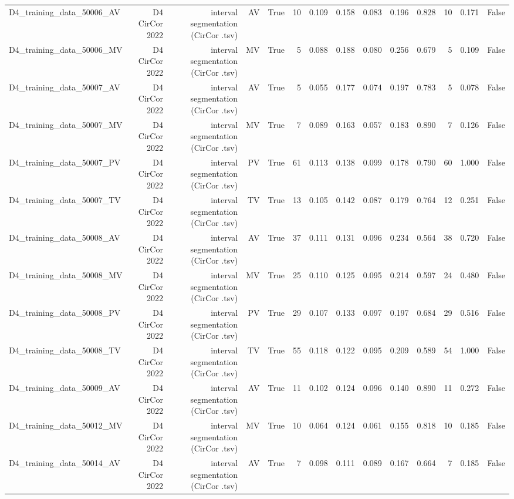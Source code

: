 \begin{table}[htbp]
\begin{tabular}{lrrrrrrrrrrrrr}
    D4\_training\_data\_50006\_AV & D4 CirCor 2022 & interval segmentation (CirCor .tsv) & AV & True & 10 & 0.109 & 0.158 & 0.083 & 0.196 & 0.828 & 10 & 0.171 & False \\
    D4\_training\_data\_50006\_MV & D4 CirCor 2022 & interval segmentation (CirCor .tsv) & MV & True & 5 & 0.088 & 0.188 & 0.080 & 0.256 & 0.679 & 5 & 0.109 & False \\
    D4\_training\_data\_50007\_AV & D4 CirCor 2022 & interval segmentation (CirCor .tsv) & AV & True & 5 & 0.055 & 0.177 & 0.074 & 0.197 & 0.783 & 5 & 0.078 & False \\
    D4\_training\_data\_50007\_MV & D4 CirCor 2022 & interval segmentation (CirCor .tsv) & MV & True & 7 & 0.089 & 0.163 & 0.057 & 0.183 & 0.890 & 7 & 0.126 & False \\
    D4\_training\_data\_50007\_PV & D4 CirCor 2022 & interval segmentation (CirCor .tsv) & PV & True & 61 & 0.113 & 0.138 & 0.099 & 0.178 & 0.790 & 60 & 1.000 & False \\
    D4\_training\_data\_50007\_TV & D4 CirCor 2022 & interval segmentation (CirCor .tsv) & TV & True & 13 & 0.105 & 0.142 & 0.087 & 0.179 & 0.764 & 12 & 0.251 & False \\
    D4\_training\_data\_50008\_AV & D4 CirCor 2022 & interval segmentation (CirCor .tsv) & AV & True & 37 & 0.111 & 0.131 & 0.096 & 0.234 & 0.564 & 38 & 0.720 & False \\
    D4\_training\_data\_50008\_MV & D4 CirCor 2022 & interval segmentation (CirCor .tsv) & MV & True & 25 & 0.110 & 0.125 & 0.095 & 0.214 & 0.597 & 24 & 0.480 & False \\
    D4\_training\_data\_50008\_PV & D4 CirCor 2022 & interval segmentation (CirCor .tsv) & PV & True & 29 & 0.107 & 0.133 & 0.097 & 0.197 & 0.684 & 29 & 0.516 & False \\
    D4\_training\_data\_50008\_TV & D4 CirCor 2022 & interval segmentation (CirCor .tsv) & TV & True & 55 & 0.118 & 0.122 & 0.095 & 0.209 & 0.589 & 54 & 1.000 & False \\
    D4\_training\_data\_50009\_AV & D4 CirCor 2022 & interval segmentation (CirCor .tsv) & AV & True & 11 & 0.102 & 0.124 & 0.096 & 0.140 & 0.890 & 11 & 0.272 & False \\
    D4\_training\_data\_50012\_MV & D4 CirCor 2022 & interval segmentation (CirCor .tsv) & MV & True & 10 & 0.064 & 0.124 & 0.061 & 0.155 & 0.818 & 10 & 0.185 & False \\
    D4\_training\_data\_50014\_AV & D4 CirCor 2022 & interval segmentation (CirCor .tsv) & AV & True & 7 & 0.098 & 0.111 & 0.089 & 0.167 & 0.664 & 7 & 0.185 & False \\

\end{tabular}
\end{table}
